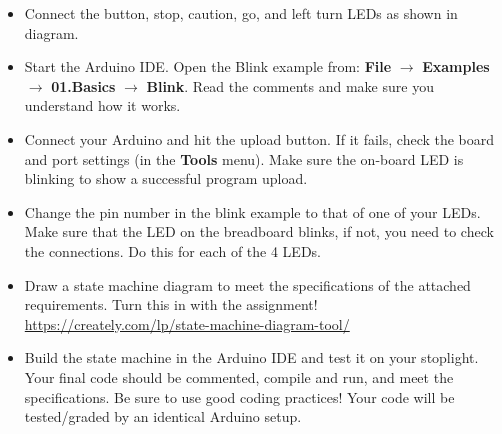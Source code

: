 \documentclass[10pt]{article}
\begin{document}
\begin{itemize}
	\item Connect the button, stop, caution, go, and left turn LEDs as shown in diagram.
	\item Start the Arduino IDE. Open the Blink example from: \textbf{File} $ \rightarrow $
	\textbf{Examples} $ \rightarrow $ \textbf{01.Basics} $ \rightarrow $ \textbf{Blink}. Read the comments and
	make sure you understand how it works.
	\item Connect your Arduino and hit the upload button.
	If it fails, check the board and port settings (in the \textbf{Tools} menu). Make
	sure the on-board LED is blinking to show a successful program upload.
	\item Change the pin number in the blink example to that of one of your LEDs. Make
	sure that the LED on the breadboard blinks, if not, you need to check the
	connections. Do this for each of the 4 LEDs.
	\item Draw a state machine diagram to meet the specifications of the attached
	requirements. Turn this in with the assignment! \url{https://creately.com/lp/state-machine-diagram-tool/}
	\item Build the state machine in the Arduino IDE and test it on your stoplight.
	Your final code should be commented, compile and run, and meet the
	specifications. Be sure to use good coding practices! Your code will be
	tested/graded by an identical Arduino setup.
\end{itemize}
\end{document}
